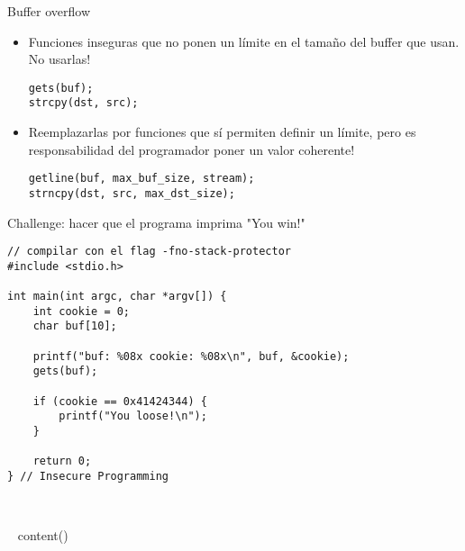 \begin{frame}[fragile]{Buffer overflow}{}
   \begin{itemize}
      \item Funciones inseguras que no ponen un l\'imite en el tama\~no del buffer que usan. No usarlas!
         \begin{lstlisting}[style=normal]
gets(buf);
strcpy(dst, src);
         \end{lstlisting}

     \item Reemplazarlas por funciones que s\'i permiten definir un l\'imite, pero es responsabilidad del programador poner un valor coherente! 
         \begin{lstlisting}[style=normal]
getline(buf, max_buf_size, stream);
strncpy(dst, src, max_dst_size);
         \end{lstlisting}
   \end{itemize}
\end{frame}
\begin{frame}[fragile]{Challenge: hacer que el programa imprima "You win!"}
         \begin{lstlisting}[style=normal]
// compilar con el flag -fno-stack-protector
#include <stdio.h>

int main(int argc, char *argv[]) {
    int cookie = 0;
    char buf[10];

    printf("buf: %08x cookie: %08x\n", buf, &cookie);
    gets(buf);

    if (cookie == 0x41424344) {
        printf("You loose!\n");
    }

    return 0;
} // Insecure Programming
         \end{lstlisting}
\end{frame}

~%

~{ content() }~




